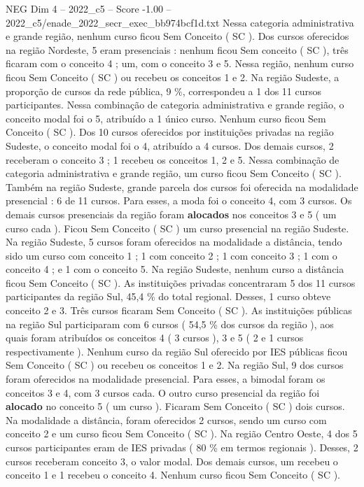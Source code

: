 \begin{textsample}{NEG Dim 4 – 2022\_c5 – Score -1.00 – 2022\_c5/enade\_2022\_secr\_exec\_bb974bcf1d.txt}
Nessa categoria administrativa e grande região, nenhum curso ficou Sem Conceito ( SC ).
Dos cursos oferecidos na região Nordeste, 5 eram presenciais : nenhum ficou Sem conceito ( SC ), três ficaram com o conceito 4 ; um, com o conceito 3 e 5.
Nessa região, nenhum curso ficou Sem Conceito ( SC ) ou recebeu os conceitos 1 e 2.
Na região Sudeste, a proporção de cursos da rede pública, 9 \%, correspondeu a 1 dos 11 cursos participantes.
Nessa combinação de categoria administrativa e grande região, o conceito modal foi o 5, atribuído a 1 único curso.
Nenhum curso ficou Sem Conceito ( SC ).
Dos 10 cursos oferecidos por instituições privadas na região Sudeste, o conceito modal foi o 4, atribuído a 4 cursos.
Dos demais cursos, 2 receberam o conceito 3 ; 1 recebeu os conceitos 1, 2 e 5.
Nessa combinação de categoria administrativa e grande região, um curso ficou Sem Conceito ( SC ).
Também na região Sudeste, grande parcela dos cursos foi oferecida na modalidade presencial : 6 de 11 cursos.
Para esses, a moda foi o conceito 4, com 3 cursos.
Os demais cursos presenciais da região foram \textbf{alocados} nos conceitos 3 e 5 ( um curso cada ).
Ficou Sem Conceito ( SC ) um curso presencial na região Sudeste.
Na região Sudeste, 5 cursos foram oferecidos na modalidade a distância, tendo sido um curso com conceito 1 ; 1 com conceito 2 ; 1 com conceito 3 ; 1 com o conceito 4 ; e 1 com o conceito 5.
Na região Sudeste, nenhum curso a distância ficou Sem Conceito ( SC ).
As instituições privadas concentraram 5 dos 11 cursos participantes da região Sul, 45,4 \% do total regional.
Desses, 1 curso obteve conceito 2 e 3.
Três cursos ficaram Sem Conceito ( SC ).
As instituições públicas na região Sul participaram com 6 cursos ( 54,5 \% dos cursos da região ), aos quais foram atribuídos os conceitos 4 ( 3 cursos ), 3 e 5 ( 2 e 1 cursos respectivamente ).
Nenhum curso da região Sul oferecido por IES públicas ficou Sem Conceito ( SC ) ou recebeu os conceitos 1 e 2.
Na região Sul, 9 dos cursos foram oferecidos na modalidade presencial.
Para esses, a bimodal foram os conceitos 3 e 4, com 3 cursos cada.
O outro curso presencial da região foi \textbf{alocado} no conceito 5 ( um curso ).
Ficaram Sem Conceito ( SC ) dois cursos.
Na modalidade a distância, foram oferecidos 2 cursos, sendo um curso com conceito 2 e um curso ficou Sem Conceito ( SC ).
Na região Centro Oeste, 4 dos 5 cursos participantes eram de IES privadas ( 80 \% em termos regionais ).
Desses, 2 cursos receberam conceito 3, o valor modal.
Dos demais cursos, um recebeu o conceito 1 e 1 recebeu o conceito 4.
Nenhum curso ficou Sem Conceito ( SC ).

\end{textsample}
